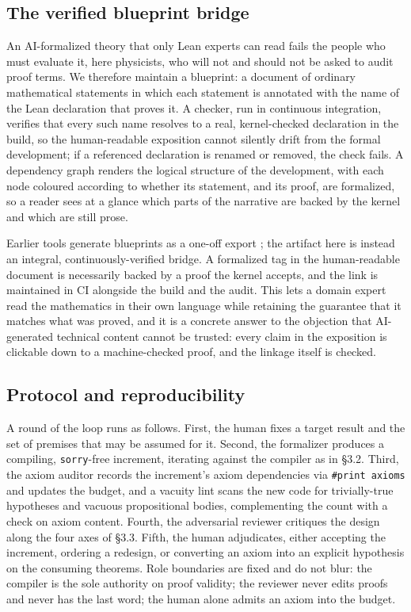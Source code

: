 \documentclass[11pt]{article}
\begin{document}
\subsection{The verified blueprint bridge}

An AI-formalized theory that only Lean experts can read fails the people who must evaluate it, here
physicists, who will not and should not be asked to audit proof terms. We therefore maintain a
blueprint: a document of ordinary mathematical statements in which each statement is annotated with
the name of the Lean declaration that proves it. A checker, run in continuous integration, verifies
that every such name resolves to a real, kernel-checked declaration in the build, so the human-readable
exposition cannot silently drift from the formal development; if a referenced declaration is renamed
or removed, the check fails. A dependency graph renders the logical structure of the development, with
each node coloured according to whether its statement, and its proof, are formalized, so a reader sees
at a glance which parts of the narrative are backed by the kernel and which are still prose.

Earlier tools generate blueprints as a one-off export \cite{r31,r44}; the artifact here is instead an
integral, continuously-verified bridge. A formalized tag in the human-readable document is necessarily
backed by a proof the kernel accepts, and the link is maintained in CI alongside the build and the
audit. This lets a domain expert read the mathematics in their own language while retaining the
guarantee that it matches what was proved, and it is a concrete answer to the objection that
AI-generated technical content cannot be trusted: every claim in the exposition is clickable down to a
machine-checked proof, and the linkage itself is checked.

\subsection{Protocol and reproducibility}

A round of the loop runs as follows. First, the human fixes a target result and the set of premises
that may be assumed for it. Second, the formalizer produces a compiling, \texttt{sorry}-free
increment, iterating against the compiler as in \S3.2. Third, the axiom auditor records the
increment's axiom dependencies via \texttt{\#print axioms} and updates the budget, and a vacuity lint
scans the new code for trivially-true hypotheses and vacuous propositional bodies, complementing the
count with a check on axiom content. Fourth, the adversarial reviewer critiques the design along the
four axes of \S3.3. Fifth, the human adjudicates, either accepting the increment, ordering a redesign,
or converting an axiom into an explicit hypothesis on the consuming theorems. Role boundaries are
fixed and do not blur: the compiler is the sole authority on proof validity; the reviewer never edits
proofs and never has the last word; the human alone admits an axiom into the budget.
\end{document}
